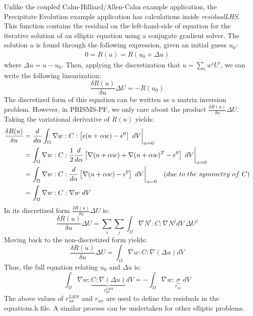 \documentclass[10pt]{article} %
\begin{document}
Unlike the coupled Cahn-Hilliard/Allen-Cahn example application, the Precipitate Evolution example application has calculations inside \emph{residualLHS}.  This function contains the residual on the left-hand-side of equation for the iterative solution of an elliptic equation using a conjugate gradient solver. The solution $u$ is found through the following expression, given an initial guess $u_0$: 
\begin{gather}
0 = R(u) = R(u_0 + \Delta u)
\end{gather}
where $\Delta u = u - u_0$. Then, applying the discretization that $u = \sum_i w^i U^i$, we can write the following linearization:
\begin{equation}
\frac{\delta R(u)}{\delta u} \Delta U = -R(u_0) \label{matrix_eqn}
\end{equation}
The discretized form of this equation can be written as a matrix inversion problem. However, in PRISMS-PF, we only care about the product $\frac{\delta R(u)}{\delta u} \Delta U$. Taking the variational derivative of $R(u)$ yields:
\begin{align}
\frac{\delta R(u)}{\delta u} &= \frac{d}{d\alpha} \int_{\Omega}   \nabla w :C: \left[ \epsilon (u+\alpha w) - \epsilon^0 \right] ~dV  \bigg{|}_{\alpha=0} \\
&=  \int_{\Omega}   \nabla w :C: \frac{1}{2}\frac{d}{d\alpha}\left[ \nabla(u+\alpha w) + \nabla(u+\alpha w)^T  - \epsilon^0\right] ~dV \bigg{|}_{\alpha=0}\\
&= \int_{\Omega}   \nabla w :C: \frac{d}{d\alpha} \left[ \nabla(u+\alpha w) - \epsilon^0 \right]  ~dV \bigg{|}_{\alpha=0} \quad (due ~to ~the ~symmetry ~of ~C) \\
&= \int_{\Omega}   \nabla w :C: \nabla w  ~dV 
\end{align}
In its discretized form $\frac{\delta R(u)}{\delta u} \Delta U$ is:
\begin{equation}
\frac{\delta R(u)}{\delta u} \Delta U = \sum_i \sum_j \int_{\Omega} \nabla N^i : C : \nabla N^j dV ~\Delta U^j
\end{equation}
Moving back to the non-discretized form yields:
\begin{equation}
\frac{\delta R(u)}{\delta u} \Delta U = \int_{\Omega} \nabla w : C : \nabla (\Delta u) dV
\end{equation}
Thus, the full equation relating $u_0$ and $\Delta u$ is:
\begin{equation}
\int_{\Omega} \nabla w : \underbrace{C : \nabla (\Delta u)}_{r_{ux}^{LHS}} dV = -\int_{\Omega}   \nabla w : \underbrace{\sigma}_{r_{ux}} ~dV
\end{equation}
The above values of $r_{ux}^{LHS}$ and $r_{ux}$ are used to define the residuals in the equations.h file. A similar process can be undertaken for other elliptic problems.
\end{document}

